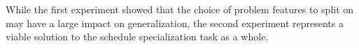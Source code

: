While the first experiment showed that the choice of problem features to split on may have a large impact on generalization,
the second experiment represents a viable solution to the schedule specialization task as a whole.


